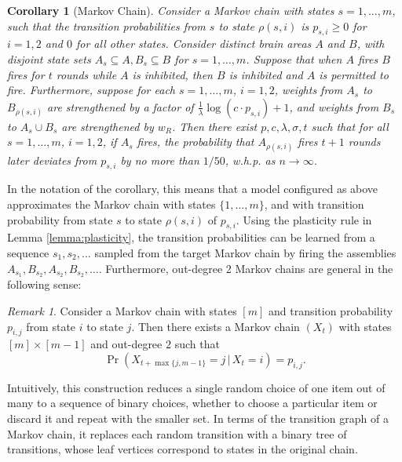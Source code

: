 \documentclass{article}
\newtheorem{corollary}[theorem]{Corollary}
\theoremstyle{remark}
\newtheorem*{remark}{Remark}
\newcommand{\1}{\mathbbm{1}}
\newcommand{\cond}{\, | \,}
\begin{document}
\begin{corollary}[Markov Chain] \label{cor:markovchain} Consider a Markov chain with states $s =1,\ldots,m$, such that the transition probabilities from $s$ to state $\rho(s, i)$ is $p_{s, i}\ge0$ for $i=1,2$ and $0$ for all other states. Consider distinct brain areas $A$ and $B$, with disjoint state sets $A_s \subseteq A, B_s \subseteq B$ for $s=1, \ldots, m$. Suppose that when $A$ fires $B$ fires for $t$ rounds while $A$ is inhibited, then $B$ is inhibited and $A$ is permitted to fire. Furthermore, suppose for each $s=1,\ldots, m$, $i=1,2$, weights from $A_s$ to $B_{\rho(s, i)}$ are strengthened by a factor of $\frac{1}{\lambda}\log(c \cdot p_{s, i}) + 1$, and weights from $B_{s}$ to $A_{s} \cup B_s$ are strengthened by $w_R$. Then there exist $p, c, \lambda, \sigma, t$ such that for all $s=1,\ldots,m$, $i=1,2$, if $A_s$ fires, the probability that $A_{\rho(s, i)}$ fires $t+1$ rounds later deviates from $p_{s, i}$ by no more than $1/50$, w.h.p. as $n \to \infty$.
\end{corollary}
In the notation of the corollary, this means that a model configured as above approximates the Markov chain with states $\{1, \ldots, m\}$, and with transition probability from state $s$ to state $\rho(s, i)$ of $p_{s, i}$. Using the plasticity rule in Lemma \ref{lemma:plasticity}, the transition probabilities can be learned from a sequence $s_1, s_2, \ldots$ sampled from the target Markov chain by firing the assemblies $A_{s_1}, B_{s_2}, A_{s_2}, B_{s_2}, \ldots$. Furthermore, out-degree 2 Markov chains are general in the following sense:

\begin{remark}
Consider a Markov chain with states $[m]$ and transition probability $p_{i, j}$ from state $i$ to state $j$. Then there exists a Markov chain $(X_t)$ with states $[m] \times [m-1]$ and out-degree $2$ such that
\[\Pr(X_{t + \max\{j, m-1\}} = j \cond X_t = i) = p_{i, j}.\]
\end{remark}
Intuitively, this construction reduces a single random choice of one item out of many to a sequence of binary choices, whether to choose a particular item or discard it and repeat with the smaller set. In terms of the transition graph of a Markov chain, it replaces each random transition with a binary tree of transitions, whose leaf vertices correspond to states in the original chain.

\end{document}
